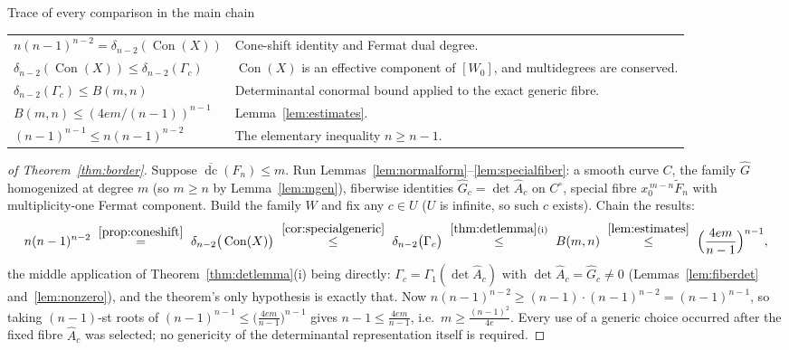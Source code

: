 \documentclass[acmsmall,screen,nonacm]{acmart}
\theoremstyle{definition}
\theoremstyle{remark}
\DeclareMathOperator{\dc}{dc}
\DeclareMathOperator{\Con}{Con}
\newcommand{\pdeg}{\delta}
\newcommand{\dcb}{\overline{\dc}}
\newcommand{\Gone}{\Gamma_{\!1}}
\begin{document}
\begin{detailbox}{Trace of every comparison in the main chain}
\begin{tabularx}{\textwidth}{@{}p{}X@{}}
$n(n-1)^{n-2}=\pdeg_{n-2}(\Con(X))$ & Cone-shift identity and Fermat dual degree. \\
$\pdeg_{n-2}(\Con(X))\le\pdeg_{n-2}(\Gamma_c)$ & $\Con(X)$ is an effective component of $[W_0]$, and multidegrees are conserved. \\
$\pdeg_{n-2}(\Gamma_c)\le B(m,n)$ & Determinantal conormal bound applied to the exact generic fibre. \\
$B(m,n)\le(4em/(n-1))^{n-1}$ & Lemma~\ref{lem:estimates}. \\
$(n-1)^{n-1}\le n(n-1)^{n-2}$ & The elementary inequality $n\ge n-1$. \\
\end{tabularx}
\end{detailbox}

\begin{proof}[of Theorem~\ref{thm:border}]
Suppose $\dcb(F_n)\le m$.  Run
Lemmas~\ref{lem:normalform}--\ref{lem:specialfiber}: a smooth curve
$C$, the family $\widehat G$ homogenized at degree $m$
(so $m\ge n$ by Lemma~\ref{lem:mgen}), fiberwise identities
$\widehat G_c=\det\widehat A_c$ on $C^\circ$, special fibre
$x_0^{\,m-n}\widetilde F_n$ with multiplicity-one Fermat component.
Build the family $W$ and fix any $c\in U$ ($U$ is infinite, so such
$c$ exists).  Chain the results:
\[
  n(n-1)^{n-2}
  \ \overset{\ref{prop:coneshift}}{=}\
  \pdeg_{n-2}\big(\Con(X)\big)
  \ \overset{\ref{cor:specialgeneric}}{\le}\
  \pdeg_{n-2}\big(\Gamma_c\big)
  \ \overset{\ref{thm:detlemma}\mathrm{(i)}}{\le}\
  B(m,n)
  \ \overset{\ref{lem:estimates}}{\le}\
  \Big(\frac{4em}{n-1}\Big)^{n-1},
\]
the middle application of Theorem~\ref{thm:detlemma}(i) being
directly: $\Gamma_c=\Gone(\det\widehat A_c)$ with
$\det\widehat A_c=\widehat G_c\ne0$ (Lemmas~\ref{lem:fiberdet}
and~\ref{lem:nonzero}), and the theorem's only hypothesis is exactly
that.  Now $n(n-1)^{n-2}\ge(n-1)\cdot(n-1)^{n-2}=(n-1)^{n-1}$, so
taking $(n-1)$-st roots of
$(n-1)^{n-1}\le\big(\tfrac{4em}{n-1}\big)^{n-1}$ gives
$n-1\le\tfrac{4em}{n-1}$, i.e.\ $m\ge\tfrac{(n-1)^2}{4e}$.
Every use of a generic choice occurred after the fixed fibre
$\widehat A_c$ was selected; no genericity of the determinantal
representation itself is required.
\end{proof}
\end{document}
